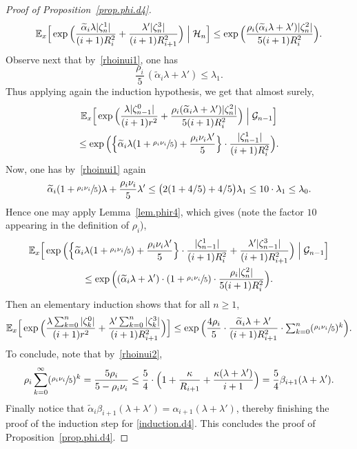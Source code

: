 \documentclass[JEP,XML,SOM,Unicode,NoFloatCountersInSection,published]{cedram}
\let\ts\textstyle
\theoremstyle{plain}
\theoremstyle{definition}
\newcommand{\1}{{\text{\Large $\mathfrak 1$}}}
\begin{document}
\begin{proof}[Proof of Proposition~\ref{prop.phi.d4}]
\[
\mathbb E_x\Big[\exp\Big(\frac{\widetilde \alpha_i\lambda |\zeta_n^1|}{(i+1)R_i^2}+ \frac{\lambda' |\zeta^3_n|}{(i+1)R_{i+1}^2}\Big)
\Bigm|\mathcal H_n \Big] \le
\exp\Big(\frac{\rho_i(\widetilde \alpha_i \lambda + \lambda') |\zeta_n^2|}{5(i+1)R_i^2}\Big).
\]
Observe next that by~\eqref{rhoinui1}, one has
\[
\frac{\rho_i}{5}\,(\widetilde \alpha_i \lambda + \lambda')\le \lambda_1.
\]
Thus applying again the induction hypothesis, we get that almost surely,
\begin{multline*}
\mathbb E_x\Big[\exp\Big(\frac{\lambda |\zeta_{n-1}^0|}{(i+1)r^2}+ \frac{\rho_i(\widetilde \alpha_i \lambda + \lambda') |\zeta_n^2|}{5(i+1)R_i^2}\Big) \Bigm|\mathcal G_{n-1} \Big]\\
\le \exp \Big(\Big\{ \widetilde \alpha_i \lambda(1 +\sfrac{\rho_i\nu_i}{5}) + \frac{\rho_i\nu_i\lambda'}{5}\Big\} \cdot \frac{|\zeta_{n-1}^1|}{(i+1)R_i^2}\Big).
\end{multline*}
Now, one has by~\eqref{rhoinui1} again
\[
\widetilde \alpha_i(1+\sfrac{\rho_i\nu_i}{5})\lambda + \frac{\rho_i\nu_i}{5}\lambda' \le \big(2(1+4/5) +4/5\big)\lambda_1 \le 10\cdot \lambda_1 \le \lambda_0.
\]
Hence one may apply Lemma~\ref{lem.phir4}, which gives (note the factor $10$ appearing in the definition of $\rho_i$),
\begin{multline*}
\mathbb E_x\Big[\exp \Big(\Big\{ \widetilde \alpha_i\lambda(1 +\sfrac{\rho_i\nu_i}{5}) + \frac{\rho_i\nu_i\lambda'}{5}\Big\} \cdot \frac{|\zeta_{n-1}^1|}{(i+1)R_i^2}+ \frac{\lambda'|\zeta_{n-1}^3|}{(i+1)R_{i+1}^2}\Big)\Bigm| \mathcal G_{n-1} \Big] \\
\le \exp\Big((\widetilde \alpha_i\lambda + \lambda')\cdot(1+\sfrac{\rho_i\nu_i}{5})\cdot \frac{ \rho_i |\zeta_n^2|}{5(i+1)R_i^2}\Big).
\end{multline*}
Then an elementary induction shows that for all $n\ge 1$,
\[
\mathbb E_x\Big[\exp\Big(\frac{\lambda\sum_{k=0}^n |\zeta_k^0|}{(i+1)r^2}+\frac{\lambda'\sum_{k=0}^n |\zeta^3_k|}{(i+1)R_{i+1}^2}\Big)\Big]
\le \exp\Big(\frac{4\rho_i}{5}\cdot \frac{ \widetilde \alpha_i\lambda+\lambda'}{(i+1)R_{i+1}^2}\cdot \ts\sum_{k=0}^n (\sfrac{\rho_i\nu_i}{5})^{k}\Big).
\]
To conclude, note that by~\eqref{rhoinui2},\vspace*{-3pt}
\[
\rho_i\sum_{k=0}^\infty (\sfrac{\rho_i\nu_i}{5})^{k} = \frac{5\rho_i}{5-\rho_i\nu_i} \le \frac{5}{4}\cdot \Big(1+\frac{\kappa }{R_{i+1}} + \frac{\kappa(\lambda+\lambda')}{i+1}\Big) =\frac 54 \beta_{i+1}(\lambda+\lambda').
\]
Finally notice that $\widetilde \alpha_i \beta_{i+1}(\lambda+\lambda') = \alpha_{i+1}(\lambda+\lambda')$, thereby finishing the proof of the induction
step for \eqref{induction.d4}.
This concludes the proof of Proposition~\ref{prop.phi.d4}.
\end{proof}
\end{document}
